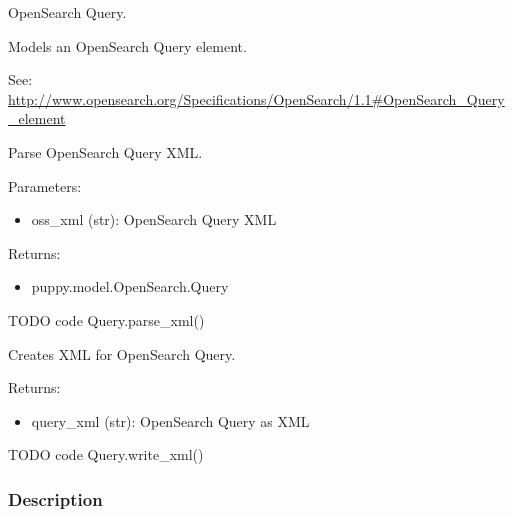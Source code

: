\documentclass[letterpaper,10pt,english]{sphinxmanual}
\begin{document}
\begin{fulllineitems}
\label{api2.0:puppy.model.Query}
OpenSearch Query.

Models an OpenSearch Query element.

See: \href{http://www.opensearch.org/Specifications/OpenSearch/1.1\#OpenSearch\_Query\_element}{http://www.opensearch.org/Specifications/OpenSearch/1.1\#OpenSearch\_Query\_element}

\begin{fulllineitems}
\label{api2.0:puppy.model.Query.parse_xml}
Parse OpenSearch Query XML.

Parameters:
\begin{itemize}
\item {} 
oss\_xml (str): OpenSearch Query XML

\end{itemize}

Returns:
\begin{itemize}
\item {} 
puppy.model.OpenSearch.Query

\end{itemize}

TODO code Query.parse\_xml()

\end{fulllineitems}


\begin{fulllineitems}
\label{api2.0:puppy.model.Query.write_xml}
Creates XML for OpenSearch Query.

Returns:
\begin{itemize}
\item {} 
query\_xml (str): OpenSearch Query as XML

\end{itemize}

TODO code Query.write\_xml()

\end{fulllineitems}


\end{fulllineitems}



\subsubsection{Description}
\label{api2.0:description}
\end{document}
